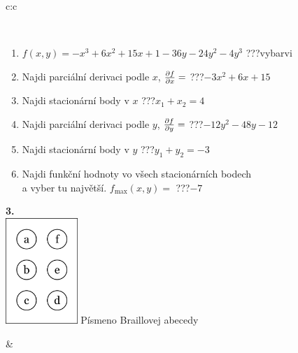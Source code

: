 \documentclass[10pt]{report}
\begin{document}
\begin{tabular}{c:c}
\begin{minipage}[c][104.5mm][t]{0.5\linewidth}
\begin{center}
\begin{minipage}{0.95\linewidth}
\begin{center}
\end{center}
\end{minipage}
\\[1mm]
\begin{minipage}{0.79\linewidth}
\begin{center}
\begin{varwidth}{\linewidth}
\begin{enumerate}
\normalsize
\item $f(x,y)=-x^3+6x^2+15x+1-36y-24y^2-4y^3$\quad \dotfill\; ???\;\dotfill \quad vybarvi
\item Najdi parciální derivaci podle $x$, $\pdv{f}{x}=$\quad \dotfill\; ???\;\dotfill \quad $-3x^2+6x+15$
\item Najdi stacionární body v $x$\quad \dotfill\; ???\;\dotfill \quad $x_1+x_2=4$
\item Najdi parciální derivaci podle $y$, $\pdv{f}{y}=$\quad \dotfill\; ???\;\dotfill \quad $-12y^2-48y-12$
\item Najdi stacionární body v $y$\quad \dotfill\; ???\;\dotfill \quad $y_1+y_2=-3$
\item Najdi funkční hodnoty vo všech stacionárních bodech \\ \phantom{xxxxxx} a vyber tu najvětší. $f_{\text{max}}(x,y)=$\quad \dotfill\; ???\;\dotfill \quad $-7$
\end{enumerate}
\end{varwidth}
\end{center}
\end{minipage}
\begin{minipage}{0.20\linewidth}
\begin{center}
{\Huge\bfseries 3.} \\[2mm]
\includegraphics[height=40mm]{../images/braille.png}
{\small Písmeno Braillovej abecedy}
\end{center}
\end{minipage}
\end{center}
\end{minipage}
&
\begin{minipage}[c][104.5mm][t]{0.5\linewidth}
\begin{center}

\end{center}
\end{minipage}
\end{tabular}
\end{document}
